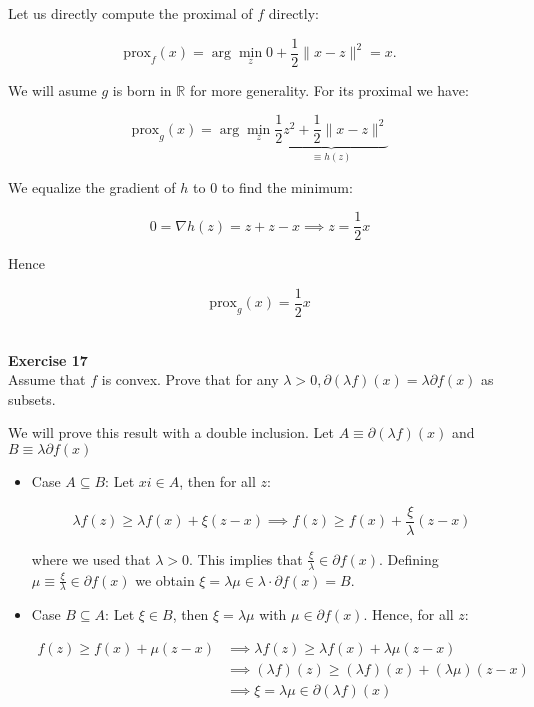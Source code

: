 \documentclass[11pt,table]{article}
\newenvironment{problem}[2][Exercise]
{ \begin{mdframed}[backgroundcolor=gray!20] \textbf{#1 #2} \\}
	{  \end{mdframed}}
\newcommand\R{\mathbb R}
\begin{document}
	Let us directly compute the proximal of $f$ directly:
	
	\[
	\text{prox}_f(x) = \arg \min_z 0 + \frac{1}{2} \parallel x - z \parallel^2 = x.
	\]
	
	We will asume $g$ is born in $\R$ for more generality. For its proximal we have:
	
	\[
	\text{prox}_g(x) = \arg \min_z \underbrace{\frac{1}{2}z^2 + \frac{1}{2} \parallel x - z \parallel^2}_{\equiv h(z)}
	\]
	
	We equalize the gradient of $h$ to $0$ to find the minimum:
	
	\[
	0 = \nabla h(z) = z + z - x \implies z = \frac{1}{2}x
	\]
	
	Hence
	
	\[
	\text{prox}_g(x) =  \frac{1}{2} x
	\] \\
	
	\begin{problem}{17}
		Assume that \( f \)  is convex. Prove that for any \( \lambda > 0, \partial(\lambda f)(x) = \lambda \partial f(x) \) as subsets.
	\end{problem}
	
	We will prove this result with a double inclusion. Let $A \equiv \partial(\lambda f)(x)$ and $B \equiv \lambda \partial f(x)$
	
	\begin{itemize}
		\item Case $A \subseteq B$: Let $xi \in A$, then for all $z$:
		
		\[
		\lambda f(z) \ge \lambda f(x) + \xi (z-x) \implies f(z) \ge f(x) + \frac{\xi}{\lambda}(z-x)
		\]
		
		where we used that $\lambda > 0$. This implies that $\frac{\xi}{\lambda} \in \partial f(x)$. Defining $\mu \equiv \frac{\xi}{\lambda} \in \partial f(x)$ we obtain $\xi = \lambda \mu \in \lambda \cdot \partial f(x) = B$.
		
		\item Case $B \subseteq A$: Let $\xi \in B$, then $\xi = \lambda \mu$ with $\mu \in \partial f(x)$. Hence, for all $z$:
		
		\begin{align*}
			f(z) \ge f(x) + \mu(z-x) & \implies \lambda f(z) \ge \lambda f(x) + \lambda\mu(z-x) \\
			& \implies (\lambda f)(z) \ge (\lambda f)(x) + (\lambda\mu)(z-x) \\
			& \implies \xi = \lambda \mu \in \partial(\lambda f)(x)
		\end{align*}
	\end{itemize}
	
\end{document}
